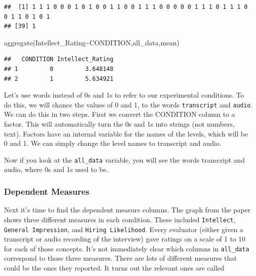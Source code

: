 \documentclass[
]{book}
\newenvironment{Shaded}{\begin{snugshade}}{\end{snugshade}}
\newcommand{\FunctionTok}[1]{\textcolor[rgb]{0.00,0.00,0.00}{#1}}
\newcommand{\NormalTok}[1]{#1}
\newcommand{\OtherTok}[1]{\textcolor[rgb]{0.56,0.35,0.01}{#1}}
\newcommand{\SpecialCharTok}[1]{\textcolor[rgb]{0.00,0.00,0.00}{#1}}
\newcommand{\StringTok}[1]{\textcolor[rgb]{0.31,0.60,0.02}{#1}}
\begin{document}
\begin{verbatim}
##  [1] 1 1 1 0 0 0 1 0 1 0 0 1 1 0 0 1 1 1 0 0 0 0 0 1 1 1 0 1 1 1 0 0 1 1 0 1 0 1
## [39] 1
\end{verbatim}

\begin{Shaded}
\begin{Highlighting}[]
\FunctionTok{aggregate}\NormalTok{(Intellect\_Rating}\SpecialCharTok{\textasciitilde{}}\NormalTok{CONDITION,all\_data,mean)}
\end{Highlighting}
\end{Shaded}

\begin{verbatim}
##   CONDITION Intellect_Rating
## 1         0         3.648148
## 2         1         5.634921
\end{verbatim}

Let's use words instead of 0s and 1s to refer to our experimental conditions. To do this, we will chance the values of 0 and 1, to the words \texttt{transcript} and \texttt{audio}. We can do this in two steps. First we convert the CONDITION column to a factor. This will automatically turn the 0s and 1s into strings (not numbers, text). Factors have an internal variable for the names of the levels, which will be 0 and 1. We can simply change the level names to transcript and audio.

\begin{Shaded}
\end{Shaded}

Now if you look at the \texttt{all\_data} variable, you will see the words transcript and audio, where 0s and 1s used to be.

\hypertarget{dependent-measures}{%
\subsubsection{Dependent Measures}\label{dependent-measures}}

Next it's time to find the dependent measure columns. The graph from the paper shows three different measures in each condition. These included \texttt{Intellect}, \texttt{General\ Impression}, and \texttt{Hiring\ Likelihood}. Every evaluator (either given a transcript or audio recording of the interview) gave ratings on a scale of 1 to 10 for each of those concepts. It's not immediately clear which columns in \texttt{all\_data} correspond to those three measures. There are lots of different measures that could be the ones they reported. It turns out the relevant ones are called
\end{document}
